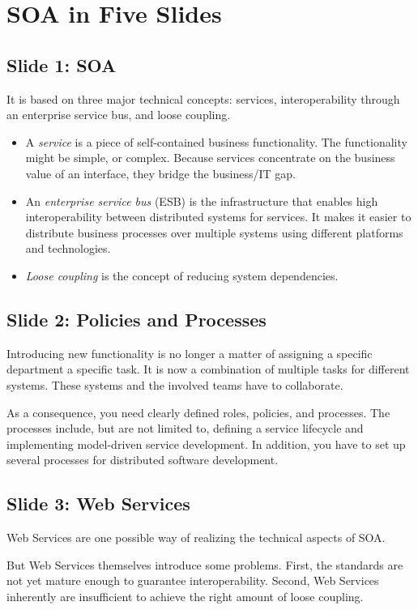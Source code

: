 \documentclass[11pt]{report}
\begin{document}
\section{SOA in Five Slides}
\subsection{Slide 1: SOA}
It is based on three major technical concepts: services, interoperability through an enterprise service bus, and loose coupling.
\begin{itemize}
	\item A \textit{service} is a piece of self-contained business functionality. The functionality might be simple, or complex. Because services concentrate on the business value of an interface, they bridge the business/IT gap.
	\item An \textit{enterprise service bus} (ESB) is the infrastructure that enables high interoperability between distributed systems for services. It makes it easier to distribute business processes over multiple systems using different platforms and technologies.
	\item \textit{Loose coupling} is the concept of reducing system dependencies.
\end{itemize}

\subsection{Slide 2: Policies and Processes}
Introducing new functionality is no longer a matter of assigning a specific department a specific task. It is now a combination of multiple tasks for different systems. These systems and the involved teams have to collaborate.

As a consequence, you need clearly defined roles, policies, and processes. The processes include, but are not limited to, defining a service lifecycle and implementing model-driven service development. In addition, you have to set up several processes for distributed software development.

\subsection{Slide 3: Web Services}
Web Services are one possible way of realizing the technical aspects of SOA.

But Web Services themselves introduce some problems. First, the standards are not yet mature enough to guarantee interoperability. Second, Web Services inherently are insufficient to achieve the right amount of loose coupling.
\end{document}
